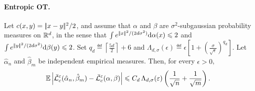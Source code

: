 \paragraph{Entropic OT.}
\begin{prop}\label{prop-sinkhorn-sample-rate}
Let \(c(x,y)=|\!| x-y |\!|^2/2\), and assume that \(\alpha\) and \(\beta\) are \(\sigma^2\)-subgaussian probability measures on \(\mathbb{R}^d\), in the sense that
$\int e^{|\!| x |\!|^2/(2d\sigma^2)}\mathrm{d}\alpha(x)\leqslant2$ and $\int e^{|\!| y |\!|^2/(2d\sigma^2)}\mathrm{d}\beta(y)\leqslant2$.
Set
$q_d\eqdef\left\lceil\frac{5d}{2}\right\rceil+6$ and $\Lambda_{d,\sigma}(\epsilon) \eqdef \epsilon\left[1+\left(\frac{\sigma}{\sqrt\epsilon}\right)^{q_d}\right]$.
Let \(\hat\alpha_n\) and \(\hat\beta_m\) be independent empirical measures. Then, for every \(\epsilon>0\),
\[
\mathbb{E}\left\lvert\bar{\mathcal{L}}_c^\varepsilon(\hat\alpha_n,\hat\beta_m)-\bar{\mathcal{L}}_c^\varepsilon(\alpha,\beta)\right\rvert
\leqslant
C_d\,\Lambda_{d,\sigma}(\varepsilon)
\left(\frac1{\sqrt n}+\frac1{\sqrt m}\right).
\]
\end{prop}
